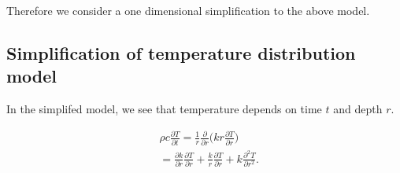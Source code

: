 \documentclass{IEEEtran} %
\begin{document}

Therefore we consider a one dimensional simplification to the above model. 

\subsection{Simplification of temperature distribution model}



In the simplifed model, we see that temperature depends on time $t$ and depth $r$. 

\begin{align}
&\rho c\frac{\partial T}{\partial t}=\frac{1}{r}\frac{\partial}{\partial r}\bigg(kr\frac{\partial T}{\partial r}\bigg)\nonumber\\%
&=\frac{\partial k}{\partial r}\frac{\partial T}{\partial r}+\frac{k}{r}\frac{\partial T}{\partial r}+k\frac{\partial^2T}{\partial r^2}.\label{heat1d}%
\end{align}
\end{document}
